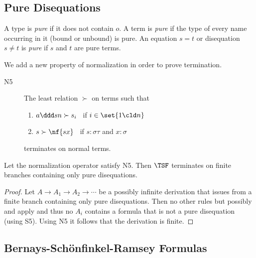 \subsection{Pure Disequations}

A type is \emph{pure} if it does not contain $o$.  A
term is \emph{pure} if the type of every name occurring
in it (bound or unbound) is pure.  An equation $s=t$ or
disequation $s\neq t$ is \emph{pure} if $s$ and $t$ are
pure terms.

We add a new property of normalization in order to prove termination.
\begin{description}
\item[{N5}] 
  The least relation $\succ$ on terms such that
  \begin{enumerate}[(1)]
  \item ${a\ddd s n}\succ{s_i}$ \ if 
    $i\in\set{1\cld n}$
  \item $s\succ\nf{sx}$ \ if $s:\sigma\tau$ and $x:\sigma$
  \end{enumerate}
  terminates on normal terms.
\end{description}

\begin{prop}
  Let the normalization operator satisfy N5.  Then
  $\TSF$ terminates on finite branches containing only
  pure disequations.
\end{prop}

\begin{proof}
  Let $A\to A_1\to A_2\to\cdots$ be a possibly infinite
  derivation that issues from a finite branch
  containing only pure disequations.  Then no other
  rules but possibly \TRFDec and \TRFFE apply
  and thus no $A_i$ contains a formula that is not
  a pure disequation (using S5).  Using N5
  it follows that the derivation is finite.
\end{proof}

\subsection{Bernays-Sch\"onfinkel-Ramsey Formulas}

